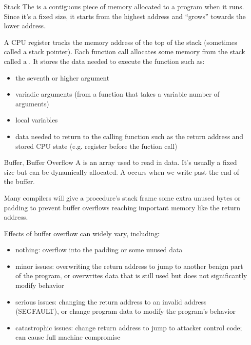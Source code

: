 \documentclass[code]{amznotes}
\begin{document}
\begin{dfnbox}{Stack}{}
    The  is a contiguous piece of memory allocated to a program when it runs. Since it's a fixed size, it starts from the highest address and ``grows'' towards the lower address.
\end{dfnbox}

A CPU register tracks the memory address of the top of the stack (sometimes called a stack pointer). Each function call allocates some memory from the stack called a . It stores the data needed to execute the function such as:
\begin{itemize}
    \item the seventh or higher argument
    \item variadic arguments (from a function that takes a variable number of arguments)
    \item local variables
    \item data needed to return to the calling function such as the return address and stored CPU state (e.g. register before the fuction call)
\end{itemize}

\begin{dfnbox}{Buffer, Buffer Overflow}{}
    A  is an array used to read in data. It's usually a fixed size but can be dynamically allocated. A  occurs when we write past the end of the buffer.
\end{dfnbox}

\begin{notebox}
    Many compilers will give a procedure's stack frame some extra unused bytes or padding to prevent buffer overflows reaching important memory like the return address.
\end{notebox}

Effects of buffer overflow can widely vary, including:
\begin{itemize}
    \item nothing: overflow into the padding or some unused data
    \item minor issues: overwriting the return address to jump to another benign part of the program, or overwrites data that is still used but does not significantly modify behavior
    \item serious issues: changing the return address to an invalid address (SEGFAULT), or change program data to modify the program's behavior
    \item catastrophic issues: change return address to jump to attacker control code; can cause full machine compromise
\end{itemize}
\end{document}
